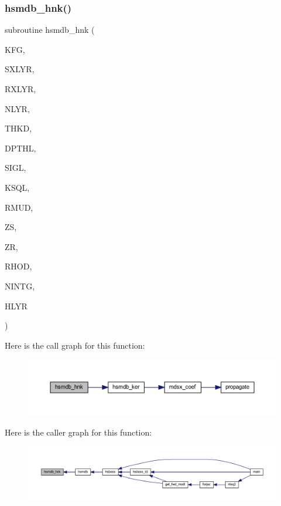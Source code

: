 \subsubsection{\texorpdfstring{hsmdb\+\_\+hnk()}{hsmdb\_hnk()}}
{\footnotesize\ttfamily subroutine hsmdb\+\_\+hnk (\begin{DoxyParamCaption}\item[{integer}]{K\+FG,  }\item[{integer}]{S\+X\+L\+YR,  }\item[{integer}]{R\+X\+L\+YR,  }\item[{integer}]{N\+L\+YR,  }\item[{real(kind=ql), dimension(nlyr)}]{T\+H\+KD,  }\item[{real(kind=ql), dimension(nlyr)}]{D\+P\+T\+HL,  }\item[{complex(kind=ql), dimension(nlyr)}]{S\+I\+GL,  }\item[{complex(kind=ql), dimension(nlyr)}]{K\+S\+QL,  }\item[{real(kind=ql), dimension(0\+:nlyr)}]{R\+M\+UD,  }\item[{real(kind=ql)}]{ZS,  }\item[{real(kind=ql)}]{ZR,  }\item[{real(kind=ql)}]{R\+H\+OD,  }\item[{integer}]{N\+I\+N\+TG,  }\item[{complex(kind=ql), dimension(nintg)}]{H\+L\+YR }\end{DoxyParamCaption})}

Here is the call graph for this function\+:\nopagebreak
\begin{figure}[H]
\begin{center}
\leavevmode
\includegraphics[width=350pt]{Leroi_8f90_aa0252ede97751947c4c840de4179175d_cgraph}
\end{center}
\end{figure}
Here is the caller graph for this function\+:\nopagebreak
\begin{figure}[H]
\begin{center}
\leavevmode
\includegraphics[width=350pt]{Leroi_8f90_aa0252ede97751947c4c840de4179175d_icgraph}
\end{center}
\end{figure}
\mbox{\label{Leroi_8f90_aa06a6e2460dd29bc7e4cd0f7378aa005}} 

